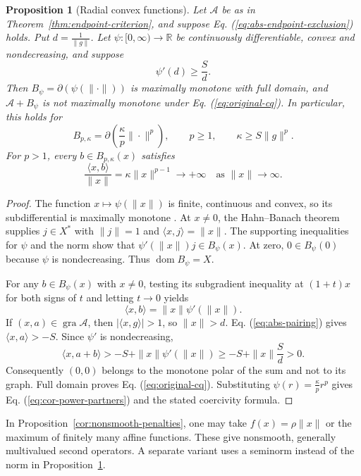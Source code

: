 \documentclass[11pt]{article}
\newcommand{\R}{\mathbb R}
\newcommand{\gra}{\operatorname{gra}}
\newcommand{\dom}{\operatorname{dom}}
\newcommand{\pair}[2]{\langle #1,#2\rangle}
\newtheorem{proposition}{Proposition}
\theoremstyle{definition}
\theoremstyle{remark}
\begin{document}
\begin{proposition}[Radial convex functions]
\label{cor:radial-partners}
Let $\mathcal A$ be as in Theorem~\ref{thm:endpoint-criterion}, and suppose Eq. (\ref{eq:abs-endpoint-exclusion}) holds. Put $d=\frac1{\|g\|}$. Let $\psi:[0,\infty)\to\R$ be continuously differentiable, convex and nondecreasing, and suppose
\[
\psi'(d)\ge\frac{S}{d}.
\]
Then $B_\psi=\partial(\psi(\|\cdot\|))$ is maximally monotone with full domain, and $\mathcal A+B_\psi$ is not maximally monotone under Eq. (\ref{eq:original-cq}). In particular, this holds for
\begin{equation}
B_{p,\kappa}=\partial\left(\frac{\kappa}{p}\|\cdot\|^p\right),
\qquad p\ge1,\qquad \kappa\ge S\|g\|^p.
\label{eq:cor-power-partners}
\end{equation}
For $p>1$, every $b\in B_{p,\kappa}(x)$ satisfies
\[
\frac{\pair{x}{b}}{\|x\|}=\kappa\|x\|^{p-1}\longrightarrow+\infty
\quad\text{as }\|x\|\to\infty.
\]
\end{proposition}
\begin{proof}
The function $x\mapsto\psi(\|x\|)$ is finite, continuous and convex, so its subdifferential is maximally monotone \cite{rockafellar1970subdiff}. At $x\ne0$, the Hahn--Banach theorem supplies $j\in X^*$ with $\|j\|=1$ and $\pair{x}{j}=\|x\|$. The supporting inequalities for $\psi$ and the norm show that $\psi'(\|x\|)j\in B_\psi(x)$. At zero, $0\in B_\psi(0)$ because $\psi$ is nondecreasing. Thus $\dom B_\psi=X$.

For any $b\in B_\psi(x)$ with $x\ne0$, testing its subgradient inequality at $(1+t)x$ for both signs of $t$ and letting $t\to0$ yields
\[
\pair{x}{b}=\|x\|\psi'(\|x\|).
\]
If $(x,a)\in\gra\mathcal A$, then $|\pair{x}{g}|>1$, so $\|x\|>d$. Eq. (\ref{eq:abs-pairing}) gives $\pair{x}{a}>-S$. Since $\psi'$ is nondecreasing,
\[
\pair{x}{a+b}>-S+\|x\|\psi'(\|x\|)
\ge-S+\|x\|\frac{S}{d}>0.
\]
Consequently $(0,0)$ belongs to the monotone polar of the sum and not to its graph. Full domain proves Eq. (\ref{eq:original-cq}). Substituting $\psi(r)=\frac{\kappa}{p}r^p$ gives Eq. (\ref{eq:cor-power-partners}) and the stated coercivity formula.
\end{proof}

In Proposition~\ref{cor:nonsmooth-penalties}, one may take $f(x)=\rho\|x\|$ or the maximum of finitely many affine functions. These give nonsmooth, generally multivalued second operators. A separate variant uses a seminorm instead of the norm in Proposition~\ref{cor:radial-partners}.
\end{document}
